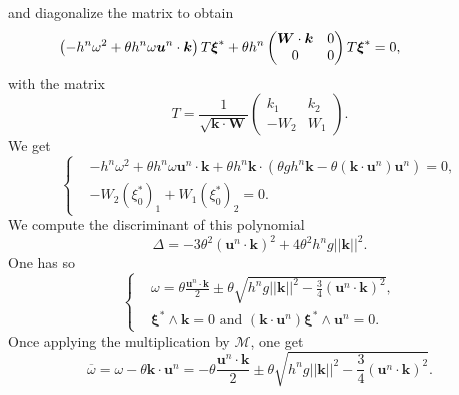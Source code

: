 \documentclass[a4paper, 11pt]{report}
\begin{document}
and diagonalize the matrix to obtain
\begin{equation*}
\hspace*{-1.5cm}\left(-h^n\omega^2+\theta h^n\omega \boldsymbol{u}^n\cdot \boldsymbol{k}\right)T\boldsymbol{\xi}^*+\theta h^n \begin{pmatrix}\boldsymbol{W}\cdot \boldsymbol{k}&0\\0&0\end{pmatrix}T\boldsymbol{\xi}^*=0,
\end{equation*}
with the matrix
\begin{equation*}
T=\frac{1}{\sqrt{\boldsymbol{k}\cdot \boldsymbol{W}}}
\begin{pmatrix}
k_1&k_2\\-W_2&W_1
\end{pmatrix}.
\end{equation*}
We get
\begin{equation*}
\left\{
\begin{split}
&-h^n\omega^2+\theta h^n\omega \boldsymbol{u}^n\cdot \boldsymbol{k}+\theta h^n\boldsymbol{k}\cdot \left(\theta gh^n\boldsymbol{k}-\theta(\boldsymbol{k}\cdot \boldsymbol{u}^n)\boldsymbol{u}^n\right)=0,\\
&-W_2(\xi_0^*)_1+W_1(\xi_0^*)_2=0.
\end{split}
\right.
\end{equation*}
We compute the discriminant of this polynomial
\begin{equation*}
\Delta =-3\theta^2(\boldsymbol{u}^n\cdot \boldsymbol{k})^2+4\theta^2h^n g||\boldsymbol{k}||^2.
\end{equation*}
One has so
\begin{equation*}
\left\{
\begin{split}
&\omega =\theta\frac{\boldsymbol{u}^n\cdot \boldsymbol{k}}{2}\pm \theta\sqrt{h^ng||\boldsymbol{k}||^2-\frac{3}{4}(\boldsymbol{u}^n\cdot \boldsymbol{k})^2},\\
&\boldsymbol{\xi}^*\wedge\boldsymbol{k}=0 \text{\ and\ } (\boldsymbol{k}\cdot \boldsymbol{u}^n)\boldsymbol{\xi}^*\wedge\boldsymbol{u}^n=0.
\end{split}
\right.
\end{equation*}
Once applying the multiplication by $\mathcal{M}$, one get
\begin{equation*}
\overline{\omega}=\omega-\theta\boldsymbol{k}\cdot \boldsymbol{u}^n=-\theta\frac{\boldsymbol{u}^n\cdot \boldsymbol{k}}{2}\pm\theta\sqrt{h^n g ||\boldsymbol{k}||^2-\frac{3}{4}(\boldsymbol{u}^n\cdot\boldsymbol{k})^2}.
\end{equation*}
\end{document}
